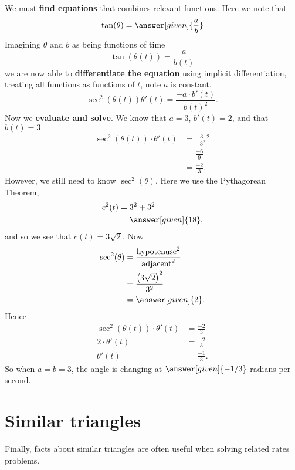 \documentclass{ximera}
\begin{document}
\begin{example}
\begin{explanation}
    We must \textbf{find equations} that combines relevant
    functions. Here we note that
    \[
    \tan(\theta) = \answer[given]{\frac{a}{b}}
    \]
    Imagining $\theta$ and $b$ as being functions of time
    \[
    \tan(\theta(t)) = \frac{a}{b(t)}
    \]
    we are now able to \textbf{differentiate the equation} using
    implicit differentiation, treating all functions as functions of
    $t$, note $a$ is constant,
    \[
    \sec^2(\theta(t))\theta'(t) = \frac{-a\cdot b'(t)}{b(t)^2}.
    \]
    Now we \textbf{evaluate and solve}.  We
    know that $a=3$, $b'(t) = 2$, and that $b(t) = 3$
    \begin{align*}
    \sec^2(\theta(t))\cdot \theta'(t) &= \frac{-3\cdot 2}{3^2}\\
    &= \frac{-6}{9}\\
    &= \frac{-2}{3}.
    \end{align*}
    However, we still need to know $\sec^2(\theta)$. Here we use the
    Pythagorean Theorem,
    \begin{align*}
    c^2(t) &= 3^2 + 3^2\\
    &=\answer[given]{18},
    \end{align*}
    and so we see that $c(t) = 3\sqrt{2}$. Now
    \begin{align*}
      \sec^2(\theta) &= \frac{\mathrm{hypotenuse}^2}{\mathrm{adjacent}^2}\\
      &= \frac{\left(3\sqrt{2}\right)^2}{3^2}\\
      &= \answer[given]{2}.
    \end{align*}
    Hence
    \begin{align*}
      \sec^2(\theta(t))\cdot \theta'(t) &= \frac{-2}{3}\\
      2\cdot \theta'(t) &= \frac{-2}{3}\\
      \theta'(t) &= \frac{-1}{3}.
    \end{align*}
    So when $a=b=3$, the angle is changing at $\answer[given]{-1/3}$
    radians per second.
  \end{explanation}
\end{example}



\section{Similar triangles}

Finally, facts about similar triangles are often useful when solving
related rates problems.
\end{document}
